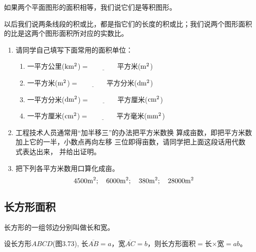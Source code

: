 \begin{Definition}
如果两个平面图形的面积相等，我们说它们是等积图形。  
\end{Definition}

以后我们说两条线段的积或比，都是指它们的长度的积或比；我们说两个图形面积的比是这两个图形面积所对应的实数比。

\begin{Practice}
\begin{enumerate}
    \item 请同学自己填写下面常用的面积单位：
\begin{enumerate}
\item     一平方公里($\rm km^2$)$=\underline{\qquad\qquad}$平方米($\rm m^2$)
\item     一平方米($\rm m^2$)$=\underline{\qquad\qquad}$平方分米($\rm dm^2$)
\item    一平方分米($\rm dm^2$)$=\underline{\qquad\qquad}$平方厘米($\rm cm^2$)
\item 一平方厘米($\rm cm^2$)$=\underline{\qquad\qquad}$平方毫米($\rm mm^2$)
\end{enumerate}
  \item 工程技术人员通常用“加半移三”的办法把平方米数换
    算成亩数，即把平方米数加上它的一半，小数点再向左移
    三位即得亩数，请同学把上面这段话用代数式表达出来，
    并给出证明。
    \item 把下列各平方米数用口算化成亩。
\[ 4500{\rm m^2};\quad     6000{\rm m^2};\quad     380{\rm m^2};
 \quad    28000{\rm m^2}\]
\end{enumerate}
\end{Practice}

\subsection{长方形面积}
长方形的一组邻边分别叫做长和宽。

设长方形$ABCD$(图3.73), 长$\overline{AB}=a$，宽$\overline{AC}=b$，则长方形面积$=$长$\times$宽$=ab$。

\begin{figure}
    \centering
\begin{tikzpicture}[>=latex]
\end{tikzpicture}
    \caption{}
\end{figure}


